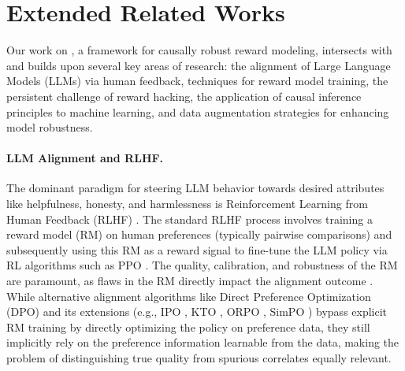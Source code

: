 \section{Extended Related Works} 
\label{sec:extended_related_works}

Our work on \carma{}, a framework for causally robust reward modeling, intersects with and builds upon several key areas of research: the alignment of Large Language Models (LLMs) via human feedback, techniques for reward model training, the persistent challenge of reward hacking, the application of causal inference principles to machine learning, and data augmentation strategies for enhancing model robustness.

\paragraph{LLM Alignment and RLHF.}
The dominant paradigm for steering LLM behavior towards desired attributes like helpfulness, honesty, and harmlessness is Reinforcement Learning from Human Feedback (RLHF) \citep{christiano2017deep, stiennon2020learning, ouyang2022training, bai2022training, askell2021general}. The standard RLHF process involves training a reward model (RM) on human preferences (typically pairwise comparisons) and subsequently using this RM as a reward signal to fine-tune the LLM policy via RL algorithms such as PPO \citep{schulman2017proximal}. The quality, calibration, and robustness of the RM are paramount, as flaws in the RM directly impact the alignment outcome \citep{casper2023open}. While alternative alignment algorithms like Direct Preference Optimization (DPO) \citep{rafailov2024direct} and its extensions (e.g., IPO \citep{azar2024general}, KTO \citep{ethayarajh2024kto}, ORPO \citep{hong2024orpo}, SimPO \citep{meng2024simpo}) bypass explicit RM training by directly optimizing the policy on preference data, they still implicitly rely on the preference information learnable from the data, making the problem of distinguishing true quality from spurious correlates equally relevant.

